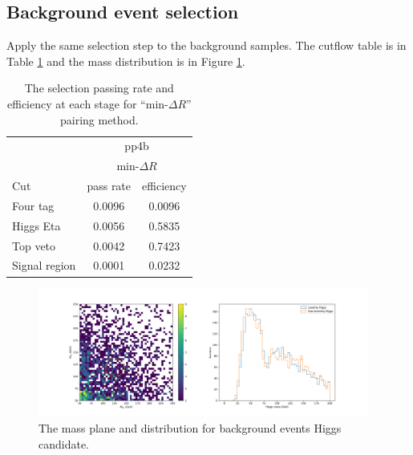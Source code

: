 \documentclass[12pt]{article}
\begin{document}
	\subsection{Background event selection}%
	\label{sub:background_event_selection}
		Apply the same selection step to the background samples. The cutflow table is in Table \ref{tab:signal_selection_efficiency_pp4b} and the mass distribution is in Figure \ref{fig:Higgs_mass_new_pp4b}.
		\begin{table}[htpb]
			\centering
			\caption{The selection passing rate and efficiency at each stage for ``$\text{min-}\Delta R$'' pairing method.}
			\label{tab:signal_selection_efficiency_pp4b}
			\begin{tabular}{l|cc}
							  & \multicolumn{2}{c}{pp4b}                                                         \\
							  & \multicolumn{2}{c}{$\text{min-}\Delta R$}\\
				Cut           & pass rate               & efficiency                \\ \hline
				Four tag      & 0.0096                  & 0.0096                    \\
				Higgs Eta     & 0.0056                  & 0.5835                    \\
				Top veto      & 0.0042                  & 0.7423                    \\
				Signal region & 0.0001                  & 0.0232                    \\
			\end{tabular}
		\end{table}
		\begin{figure}[htpb]
			\centering
			\includegraphics[width=0.97\textwidth]{Higgs_mass_new_mindR_pp4b.png}
			\caption{The mass plane and distribution for background events Higgs candidate.}
			\label{fig:Higgs_mass_new_pp4b}
		\end{figure}

	
\end{document}
